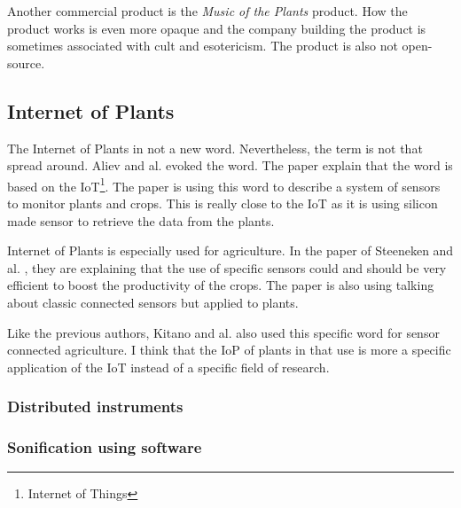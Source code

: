 Another commercial product is the \textit{Music of the Plants} product. How the product works is even more opaque and the company building the product
is sometimes associated with cult and esotericism. The product is also not open-source.


\subsection{Internet of Plants}

The Internet of Plants in not a new word. Nevertheless, the term is not that spread around.
Aliev and al. \cite{alievInternetPlantsApplication2018} evoked the word. The paper explain that
the word is based on the IoT\footnote{Internet of Things}. The paper is using this word 
to describe a system of sensors to monitor plants and crops. This is really close to the IoT
as it is using silicon made sensor to retrieve the data from the plants.

Internet of Plants is especially used for agriculture. In the paper of Steeneken and al.
\cite{steenekenSensorsAgricultureInternet2023}, they are explaining that the use of specific
sensors could and should be very efficient to boost the productivity of the crops.
The paper is also using talking about classic connected sensors but applied to plants.

Like the previous authors, Kitano and al. \cite{kitanoInternetPlantsIoP2022} also used 
this specific word for sensor connected agriculture. I think that the IoP of plants in 
that use is more a specific application of the IoT instead of a specific field of research.


\subsubsection{Distributed instruments}



\subsubsection{Sonification using software}